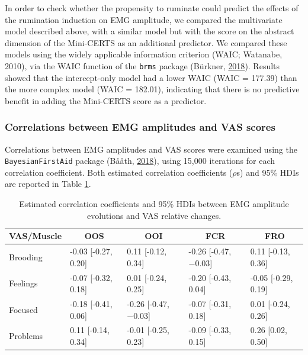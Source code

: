 \documentclass[a4paper,12pt,twoside,openright,oldfontcommands,final]{memoir}
\begin{document}
In order to check whether the propensity to ruminate could predict the effects of the rumination induction on EMG amplitude, we compared the multivariate model described above, with a similar model but with the score on the abstract dimension of the Mini-CERTS as an additional predictor. We compared these models using the widely applicable information criterion (WAIC; Watanabe, 2010), via the WAIC function of the \texttt{brms} package (Bürkner, \protect\hyperlink{ref-R-brms}{2018}). Results showed that the intercept-only model had a lower WAIC (WAIC = 177.39) than the more complex model (WAIC = 182.01), indicating that there is no predictive benefit in adding the Mini-CERTS score as a predictor.

\hypertarget{correlations-between-emg-amplitudes-and-vas-scores}{%
\subsubsection{Correlations between EMG amplitudes and VAS scores}\label{correlations-between-emg-amplitudes-and-vas-scores}}

Correlations between EMG amplitudes and VAS scores were examined using the \texttt{BayesianFirstAid} package (Bååth, \protect\hyperlink{ref-R-BayesianFirstAid}{2018}), using 15,000 iterations for each correlation coefficient. Both estimated correlation coefficients (\(\rho\)s) and 95\% HDIs are reported in Table \ref{tab:table1}.

\begin{table}[H]
\begin{center}
\begin{threeparttable}
\caption{\label{tab:table1}Estimated correlation coefficients and 95\% HDIs between EMG amplitude evolutions and VAS relative changes.}
\small{
\begin{tabular}{lllll}
\toprule
VAS/Muscle & \multicolumn{1}{c}{OOS} & \multicolumn{1}{c}{OOI} & \multicolumn{1}{c}{FCR} & \multicolumn{1}{c}{FRO}\\
\midrule
Brooding & -0.03 [-0.27, 0.20] & 0.11 [-0.12, 0.34] & -0.26 [-0.47, −0.03] & 0.11 [-0.13, 0.36]\\
Feelings & -0.07 [-0.32, 0.18] & 0.01 [-0.24, 0.25] & -0.20 [-0.43, 0.04] & -0.05 [-0.29, 0.19]\\
Focused & -0.18 [-0.41, 0.06] & -0.26 [-0.47, −0.03] & -0.07 [-0.31, 0.18] & 0.01 [-0.24, 0.26]\\
Problems & 0.11 [-0.14, 0.34] & -0.01 [-0.25, 0.23] & -0.09 [-0.33, 0.15] & 0.26 [0.02, 0.50]\\
\bottomrule
\end{tabular}
}
\end{threeparttable}
\end{center}
\end{table}
\end{document}
